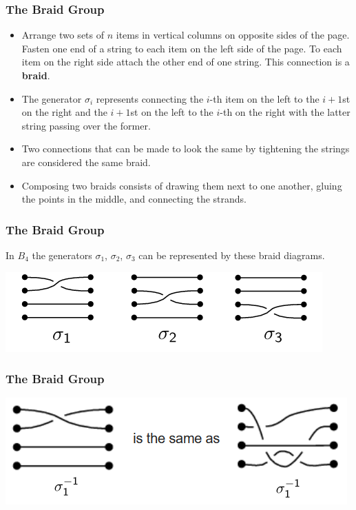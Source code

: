 \documentclass{beamer}
\begin{document}
\begin{frame}
	\frametitle{The Braid Group}
	\begin{itemize}
	\item Arrange two sets of $n$ items in vertical columns on opposite sides of the page. Fasten one end of a string to each item on the left side of the page. To each item on the right side attach the other end of one string. This connection is a \textbf{braid}.\pause

	\item The generator $\sigma_i$ represents connecting the $i$-th item on the left to the $i+1$st on the right and the $i+1$st on the left to the $i$-th on the right with the latter string passing over the former.\pause

	\item Two connections that can be made to look the same by tightening the strings are considered the same braid.\pause

	\item Composing two braids consists of drawing them next to one another, gluing the points in the middle, and connecting the strands.
	\end{itemize}
\end{frame}

\begin{frame}
	\frametitle{The Braid Group}
	\begin{example}
		In $B_4$ the generators $\sigma_1$, $\sigma_2$, $\sigma_3$ can be represented by these braid diagrams.
	\end{example}\pause
	\vfill
	\centering
		\includegraphics[scale=.7]{b4gens.png}
\end{frame}

\begin{frame}
	\frametitle{The Braid Group}
	\centering
	\includegraphics[scale=.6]{same.PNG}
\end{frame}
\end{document}
